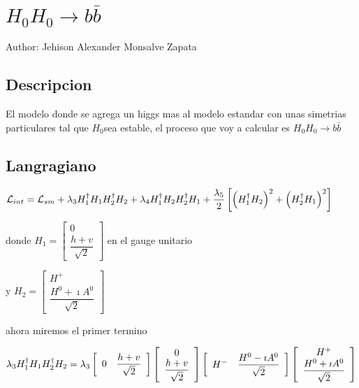 
\chapter{$H_{0}H_{0}\rightarrow b\bar{b}$}

Author: Jehison Alexander Monsalve Zapata

\section*{Descripcion}

El modelo donde se agrega un higgs mas al modelo estandar con unas
simetrias particulares tal que $H_{0}$sea estable, el proceso que
voy a calcular es $H_{0}H_{0}\rightarrow b\bar{b}$


\section*{Langragiano}

$\mathcal{L}_{int}=\mathcal{L}_{sm}+\lambda_{3}H_{1}^{\dagger}H_{1}H_{2}^{\text{\ensuremath{\dagger}}}H_{2}+\lambda_{4}H_{1}^{\dagger}H_{2}H_{2}^{\dagger}H_{1}+\dfrac{\lambda_{5}}{2}\left[\left(H_{1}^{\dagger}H_{2}\right)^{2}+\left(H_{2}^{\dagger}H_{1}\right)^{2}\right]$

donde $H_{1}=\left[\begin{array}{c}
0\\
\dfrac{h+v}{\sqrt{2}}\end{array}\right]$ en el gauge unitario

y $H_{2}=\left[\begin{array}{c}
H^{+}\\
\dfrac{H^{0}+\imath A^{0}}{\sqrt{2}}\end{array}\right]$

ahora miremos el primer termino

\[
\lambda_{3}H_{1}^{\dagger}H_{1}H_{2}^{\text{\ensuremath{\dagger}}}H_{2}=\lambda_{3}\left[\begin{array}{cc}
0 & \dfrac{h+v}{\sqrt{2}}\end{array}\right]\left[\begin{array}{c}
0\\
\dfrac{h+v}{\sqrt{2}}\end{array}\right]\left[\begin{array}{cc}
H^{-} & \dfrac{H^{0}-\imath A^{0}}{\sqrt{2}}\end{array}\right]\left[\begin{array}{c}
H^{+}\\
\dfrac{H^{0}+\imath A^{0}}{\sqrt{2}}\end{array}\right]\]


